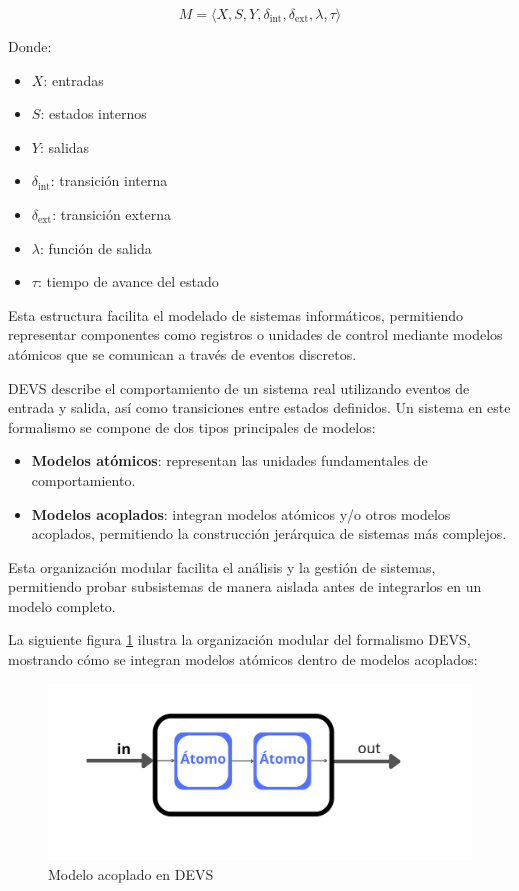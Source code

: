 \documentclass[12pt,oneside]{templates/unerthesis}
\providecommand{\tightlist}{%
  \setlength{\itemsep}{0pt}\setlength{\parskip}{0pt}}
\begin{document}
\begin{equation}
M = \langle X, S, Y, \delta_{\text{int}}, \delta_{\text{ext}}, \lambda, \tau \rangle
\label{eq:devs}
\end{equation}

Donde:

\begin{itemize}
\tightlist
\item
  \(X\): entradas
\item
  \(S\): estados internos
\item
  \(Y\): salidas
\item
  \(\delta_{\text{int}}\): transición interna
\item
  \(\delta_{\text{ext}}\): transición externa
\item
  \(\lambda\): función de salida
\item
  \(\tau\): tiempo de avance del estado
\end{itemize}

Esta estructura facilita el modelado de sistemas informáticos, permitiendo representar componentes como registros o unidades de control mediante modelos atómicos que se comunican a través de eventos discretos.

DEVS describe el comportamiento de un sistema real utilizando eventos de entrada y salida, así como transiciones entre estados definidos. Un sistema en este formalismo se compone de dos tipos principales de modelos:

\begin{itemize}
\tightlist
\item
  \textbf{Modelos atómicos}: representan las unidades fundamentales de comportamiento.
\item
  \textbf{Modelos acoplados}: integran modelos atómicos y/o otros modelos acoplados, permitiendo la construcción jerárquica de sistemas más complejos.
\end{itemize}

Esta organización modular facilita el análisis y la gestión de sistemas, permitiendo probar subsistemas de manera aislada antes de integrarlos en un modelo completo.

La siguiente figura \ref{fig:acoplado} ilustra la organización modular del formalismo DEVS, mostrando cómo se integran modelos atómicos dentro de modelos acoplados:

\begin{figure}

{\centering \includegraphics[width=1\linewidth]{images/acoplado} 

}

\caption{Modelo acoplado en DEVS}\label{fig:acoplado}
\end{figure}
\end{document}
